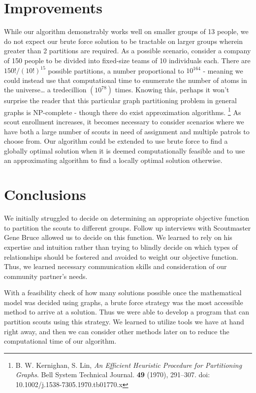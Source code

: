 \documentclass{amsart}
\theoremstyle{definition}
\theoremstyle{remark}
\numberwithin{equation}{section}
\begin{document}
\section*{Improvements}
While our algorithm demonstrably works well on smaller groups of 13 people, we do not expect our brute force solution to be tractable on larger groups wherein greater than 2 partitions are required. As a possible scenario, consider a company of 150 people to be divided into fixed-size teams of 10 individuals each. There are $150! / (10!)^{15}$ possible partitions, a number proportional to $10^{164}$ - meaning we could instead use that computational time to enumerate the number of atoms in the universe… a tredecillion $(10^{78})$ times. Knowing this, perhaps it won’t surprise the reader that this particular graph partitioning problem in general graphs is NP-complete - though there do exist approximation algorithms.%
\footnote{B. W. Kernighan, S. Lin, \textit{An Efficient Heuristic Procedure for Partitioning Graphs}. Bell System Technical Journal. \textbf{49} (1970), 291--307. doi: 10.1002/j.1538-7305.1970.tb01770.x}%
As scout enrollment increases, it becomes necessary to consider scenarios where we have both a large number of scouts in need of assignment and multiple patrols to choose from. Our algorithm could be extended to use brute force to find a globally optimal solution when it is deemed computationally feasible and to use an approximating algorithm to find a locally optimal solution otherwise. 

\section*{Conclusions}
We initially struggled to decide on determining an appropriate objective function to partition the scouts to different groups. Follow up interviews with Scoutmaster Gene Bruce allowed us to decide on this function. We learned to rely on his expertise and intuition rather than trying to blindly decide on which types of relationships should be fostered and avoided to weight our objective function. Thus, we learned necessary communication skills and consideration of our community partner's needs.

With a feasibility check of how many solutions possible once the mathematical model was decided using graphs, a brute force strategy was the most accessible method to arrive at a solution. Thus we were able to develop a program that can partition scouts using this strategy. We learned to utilize tools we have at hand right away, and then we can consider other methods later on to reduce the computational time of our algorithm.
\end{document}
